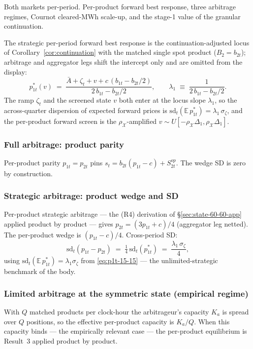 \documentclass[11pt,a4paper]{article}
\theoremstyle{definition}
\theoremstyle{remark}
\theoremstyle{plain}
\begin{document}
Both markets per-period. Per-product forward best response, three arbitrage regimes, Cournot cleared-MWh scale-up, and the stage-1 value of the granular continuation.

The strategic per-period forward best response is the continuation-adjusted locus of Corollary~\ref{cor:continuation} with the matched single spot product ($B_2 = b_{2t}$); arbitrage and aggregator legs shift the intercept only and are omitted from the display:
\begin{equation}
p_{1t}^*(v) \;=\; \frac{\bar A + \zeta_t + v + c\,(b_{1t} - b_{2t}/2)}{2\, b_{1t} - b_{2t}/2},
\qquad
\lambda_1 \;\equiv\; \frac{1}{2\, b_{1t} - b_{2t}/2}.
\label{eq:p1t-15-15}
\end{equation}
The ramp $\zeta_t$ and the screened state $v$ both enter at the locus slope $\lambda_1$, so the across-quarter dispersion of expected forward prices is $\mathrm{sd}_t(\mathbb{E}\,p_{1t}^*) = \lambda_1\,\sigma_\zeta$, and the per-product forward screen is the $\rho_{\mathcal X}$-amplified $v \sim U[-\rho_{\mathcal X}\Delta_1, \rho_{\mathcal X}\Delta_1]$.

\subsubsection{Full arbitrage: product parity}
Per-product parity $p_{1t} = p_{2t}$ pins $s_t = b_{2t}(p_{1t} - c) + S^{op}_{2t}$. The wedge SD is zero by construction.

\subsubsection{Strategic arbitrage: product wedge and SD}
Per-product strategic arbitrage --- the (R4) derivation of \S\ref{sec:state-60-60-app} applied product by product --- gives $p_{2t} = (3 p_{1t} + c)/4$ (aggregator leg netted). The per-product wedge is $(p_{1t} - c)/4$. Cross-period SD:
\[
\mathrm{sd}_t(p_{1t} - p_{2t}) \;=\; \tfrac{1}{4}\,\mathrm{sd}_t(p_{1t}^*) \;=\; \frac{\lambda_1\,\sigma_\zeta}{4},
\]
using $\mathrm{sd}_t(\mathbb{E}\,p_{1t}^*) = \lambda_1\sigma_\zeta$ from \eqref{eq:p1t-15-15} --- the unlimited-strategic benchmark of the body.

\subsubsection{Limited arbitrage at the symmetric state (empirical regime)}

With $Q$ matched products per clock-hour the arbitrageur's capacity $K_a$ is spread over $Q$ positions, so the effective per-product capacity is $K_a/Q$. When this capacity binds --- the empirically relevant case --- the per-product equilibrium is \citeauthor{ito_reguant_2016} Result~3 applied product by product.
\end{document}
